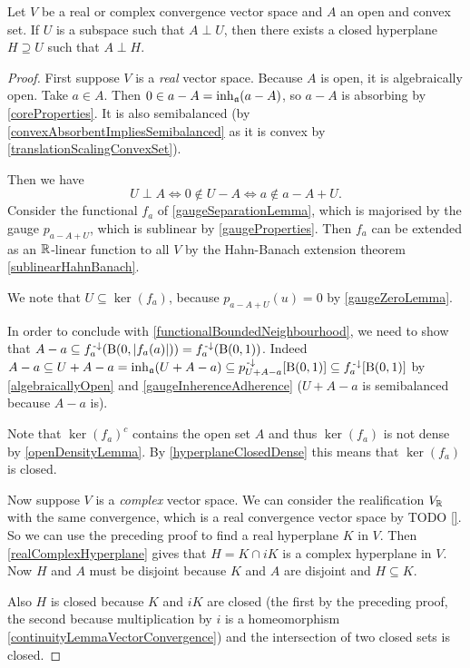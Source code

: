 \begin{theorem}[Mazur] \label{MazurTheorem}
Let $V$ be a real or complex convergence vector space and $A$ an open and convex set. If $U$ is a subspace such that $A\perp U$, then there exists a closed hyperplane $H \supseteq U$ such that $A\perp H$.
\end{theorem}
\begin{proof}
First suppose $V$ is a \emph{real} vector space. Because $A$ is open, it is algebraically open. Take $a\in A$. Then $0\in a-A = \operatorname{inh}_{\mathfrak{a}}(a-A)$, so $a-A$ is absorbing by \ref{coreProperties}. It is also semibalanced (by \ref{convexAbsorbentImpliesSemibalanced} as it is convex by \ref{translationScalingConvexSet}).

Then we have
\[ U\perp A \iff 0\notin U-A \iff a \notin a-A+U. \]
Consider the functional $f_{a}$ of \ref{gaugeSeparationLemma}, which is majorised by the gauge $p_{a-A+U}$, which is sublinear by \ref{gaugeProperties}. Then $f_a$ can be extended as an $\mathbb{R}$-linear function to all $V$ by the Hahn-Banach extension theorem \ref{sublinearHahnBanach}.

We note that $U\subseteq \ker(f_a)$, because $p_{a-A+U}(u) = 0$ by \ref{gaugeZeroLemma}.

In order to conclude with \ref{functionalBoundedNeighbourhood}, we need to show that $A-a \subseteq f_a^{{\text{\hspace{0.15em}-}\downarrow}}(\operatorname{B}(0,|f_a(a)|)) = f_a^{{\text{\hspace{0.15em}-}\downarrow}}(\operatorname{B}(0,1))$.
Indeed $A-a \subseteq U+A-a = \operatorname{inh}_\mathfrak{a}(U+A-a) \subseteq p_{U+A-a}^{\text{\hspace{0.15em}-}\downarrow}[\operatorname{B}(0,1)] \subseteq f_{a}^{\text{\hspace{0.15em}-}\downarrow}[\operatorname{B}(0,1)]$ by \ref{algebraicallyOpen} and \ref{gaugeInherenceAdherence} ($U+A-a$ is semibalanced because $A-a$ is).

Note that $\ker(f_a)^c$ contains the open set $A$ and thus $\ker(f_a)$ is not dense by \ref{openDensityLemma}. By \ref{hyperplaneClosedDense} this means that $\ker(f_a)$ is closed.

Now suppose $V$ is a \emph{complex} vector space. We can consider the realification $V_{\mathbb{R}}$ with the same convergence, which is a real convergence vector space by TODO \ref{}. So we can use the preceding proof to find a real hyperplane $K$ in $V$. Then \ref{realComplexHyperplane} gives that $H = K\cap iK$ is a complex hyperplane in $V$. Now $H$ and $A$ must be disjoint because $K$ and $A$ are disjoint and $H \subseteq K$.

Also $H$ is closed because $K$ and $iK$ are closed (the first by the preceding proof, the second because multiplication by $i$ is a homeomorphism \ref{continuityLemmaVectorConvergence}) and the intersection of two closed sets is closed.
\end{proof}
